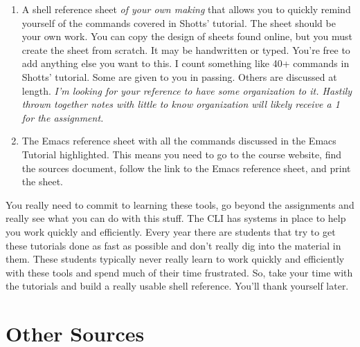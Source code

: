 \documentclass[nobib]{tufte-handout}
\begin{document}
\begin{enumerate}
\item A shell reference sheet \textit{of your own making} that allows you to quickly remind yourself of the commands covered in Shotts' tutorial. The sheet should be your own work. You can copy the design of sheets found online, but you must create the sheet from scratch. It may be handwritten or typed. You're free to add anything else you want to this. I count something like 40+ commands in Shotts' tutorial. Some are given to you in passing. Others are discussed at length.  \textit{I'm looking for your reference to have some organization to it. Hastily thrown together notes with little to know organization will likely receive a 1 for the assignment.}

\item The Emacs reference sheet with all the commands discussed in the Emacs Tutorial highlighted. This means you need to go to the course website, find the sources document, follow the link to the Emacs reference sheet, and print the sheet.
\end{enumerate}

You really need to commit to learning these tools, go beyond the assignments and really see what you can do with this stuff. The CLI has systems in place to help you work quickly and efficiently. Every year there are students that try to get these tutorials done as fast as possible and don't really dig into the material in them. These students typically never really learn to work quickly and efficiently with these tools and spend much of their time frustrated. So, take your time with the tutorials and build a really usable shell reference. You'll thank yourself later.


\section{Other Sources}
\end{document}
